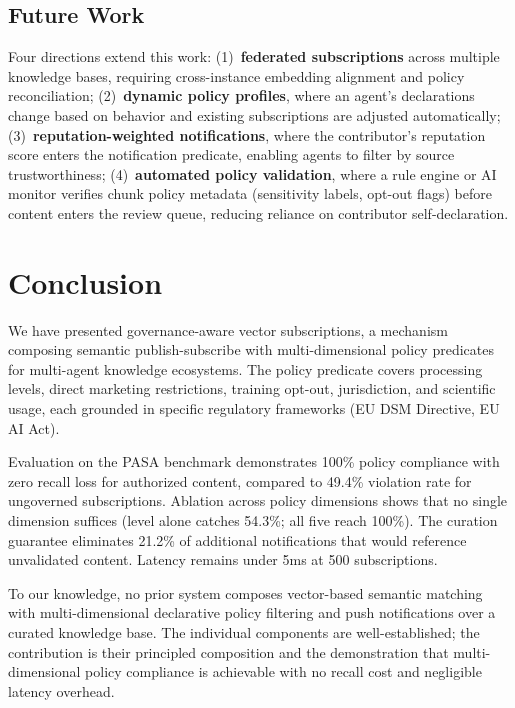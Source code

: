 \documentclass[11pt]{article}
\begin{document}
\subsection{Future Work}

Four directions extend this work: (1)~\textbf{federated subscriptions} across multiple knowledge bases, requiring cross-instance embedding alignment and policy reconciliation; (2)~\textbf{dynamic policy profiles}, where an agent's declarations change based on behavior and existing subscriptions are adjusted automatically; (3)~\textbf{reputation-weighted notifications}, where the contributor's reputation score enters the notification predicate, enabling agents to filter by source trustworthiness; (4)~\textbf{automated policy validation}, where a rule engine or AI monitor verifies chunk policy metadata (sensitivity labels, opt-out flags) before content enters the review queue, reducing reliance on contributor self-declaration.

\section{Conclusion}

We have presented governance-aware vector subscriptions, a mechanism composing semantic publish-subscribe with multi-dimensional policy predicates for multi-agent knowledge ecosystems. The policy predicate covers processing levels, direct marketing restrictions, training opt-out, jurisdiction, and scientific usage, each grounded in specific regulatory frameworks (EU DSM Directive, EU AI Act).

Evaluation on the PASA benchmark demonstrates 100\% policy compliance with zero recall loss for authorized content, compared to 49.4\% violation rate for ungoverned subscriptions. Ablation across policy dimensions shows that no single dimension suffices (level alone catches 54.3\%; all five reach 100\%). The curation guarantee eliminates 21.2\% of additional notifications that would reference unvalidated content. Latency remains under 5ms at 500 subscriptions.

To our knowledge, no prior system composes vector-based semantic matching with multi-dimensional declarative policy filtering and push notifications over a curated knowledge base. The individual components are well-established; the contribution is their principled composition and the demonstration that multi-dimensional policy compliance is achievable with no recall cost and negligible latency overhead.
\end{document}
